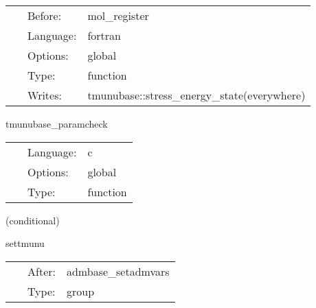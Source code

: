 \documentclass{article}
\begin{document}
\hspace{5mm}{\it set the stress\_energy\_state variable } 


\hspace{5mm}

 \begin{tabular*}{160mm}{cll} 
~ & Before:  & mol\_register \\ 
~ & Language:  & fortran \\ 
~ & Options:  & global \\ 
~ & Type:  & function \\ 
~ & Writes:  & tmunubase::stress\_energy\_state(everywhere) \\ 
\end{tabular*} 


\vspace{5mm}


\hspace{5mm} tmunubase\_paramcheck 

\hspace{5mm}{\it check that no deprecated parameters are used. } 


\hspace{5mm}

 \begin{tabular*}{160mm}{cll} 
~ & Language:  & c \\ 
~ & Options:  & global \\ 
~ & Type:  & function \\ 
\end{tabular*} 


\vspace{5mm}

   (conditional) 

\hspace{5mm} settmunu 

\hspace{5mm}{\it group for calculating the stress-energy tensor } 


\hspace{5mm}

 \begin{tabular*}{160mm}{cll} 
~ & After:  & admbase\_setadmvars \\ 
~ & Type:  & group \\ 
\end{tabular*} 


\vspace{5mm}
\end{document}
